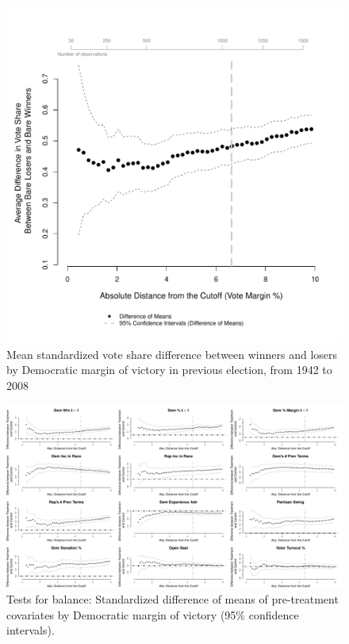 \documentclass[letterpaper,twoside,12pt]{article}
\begin{document}
\begin{figure}
  \caption{Mean standardized vote share difference between winners and losers by Democratic margin of victory in previous election, from 1942 to 2008}\label{fig:main_est}
\vspace{-1mm}
  \centerline{\includegraphics[width=1\textwidth]{no_add_est_plot_standardized.pdf}}
  \end{figure}
\clearpage


\clearpage
\begin{figure}
\caption{Tests for balance: Standardized difference of means of pre-treatment covariates by Democratic margin of victory (95\% confidence intervals).}\label{fig:balancepartial_12}
 \vspace{-1mm}
   \centerline{\includegraphics[width=1\textwidth]{balance_plots_12.pdf}}
    \end{figure}
\clearpage


\clearpage
	

\end{document}
